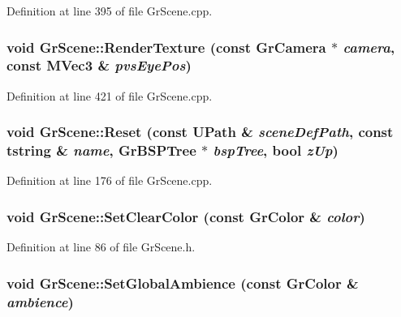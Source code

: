Definition at line 395 of file GrScene.cpp.\hypertarget{class_gr_scene_5e92ae713e6a097e7407cb82c9a45db7}{
\subsubsection[{RenderTexture}]{\setlength{\rightskip}{0pt plus 5cm}void GrScene::RenderTexture (const {\bf GrCamera} $\ast$ {\em camera}, \/  const {\bf MVec3} \& {\em pvsEyePos})}}
\label{class_gr_scene_5e92ae713e6a097e7407cb82c9a45db7}




Definition at line 421 of file GrScene.cpp.\hypertarget{class_gr_scene_b95fdcbb9647160d1491e8de740122a7}{
\subsubsection[{Reset}]{\setlength{\rightskip}{0pt plus 5cm}void GrScene::Reset (const {\bf UPath} \& {\em sceneDefPath}, \/  const {\bf tstring} \& {\em name}, \/  {\bf GrBSPTree} $\ast$ {\em bspTree}, \/  bool {\em zUp})}}
\label{class_gr_scene_b95fdcbb9647160d1491e8de740122a7}




Definition at line 176 of file GrScene.cpp.\hypertarget{class_gr_scene_52d1ea4f232a02be349daed6a108a6c6}{
\subsubsection[{SetClearColor}]{\setlength{\rightskip}{0pt plus 5cm}void GrScene::SetClearColor (const {\bf GrColor} \& {\em color})}}
\label{class_gr_scene_52d1ea4f232a02be349daed6a108a6c6}




Definition at line 86 of file GrScene.h.\hypertarget{class_gr_scene_d8cf055496150d2f331ef24cf74dc0b6}{
\subsubsection[{SetGlobalAmbience}]{\setlength{\rightskip}{0pt plus 5cm}void GrScene::SetGlobalAmbience (const {\bf GrColor} \& {\em ambience})}}
\label{class_gr_scene_d8cf055496150d2f331ef24cf74dc0b6}




